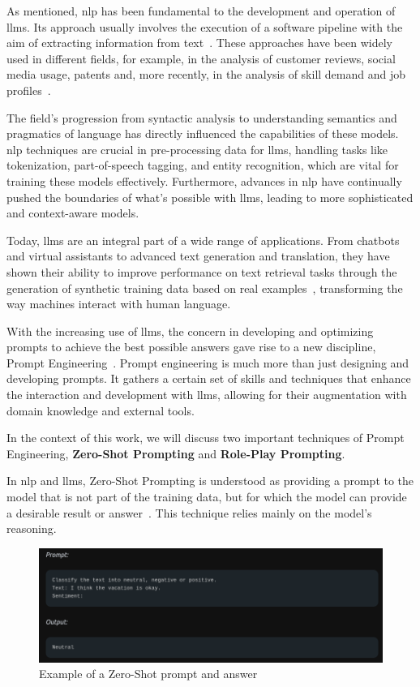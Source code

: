 As mentioned, \ac{nlp} has been fundamental to the development and operation of \ac{llms}. Its approach usually involves the execution of a software pipeline with the aim of extracting information from text~\cite{CHIARELLO2021121177}. These approaches have been widely used in different fields, for example, in the analysis of customer reviews, social media usage, patents and, more recently, in the analysis of skill demand and job profiles~\cite{CHIARELLO2021121177, Fareri_2021}.

The field's progression from syntactic analysis to understanding semantics and pragmatics of language has directly influenced the capabilities of these models. \ac{nlp} techniques are crucial in pre-processing data for \ac{llms}, handling tasks like tokenization, part-of-speech tagging, and entity recognition, which are vital for training these models effectively. Furthermore, advances in \ac{nlp} have continually pushed the boundaries of what's possible with \ac{llms}, leading to more sophisticated and context-aware models.

Today, \ac{llms} are an integral part of a wide range of applications. From chatbots and virtual assistants to advanced text generation and translation, they have shown their ability to improve performance on text retrieval tasks through the generation of synthetic training data based on real examples~\cite{clavié2023large}, transforming the way machines interact with human language. 

With the increasing use of \ac{llms}, the concern in developing and optimizing prompts to achieve the best possible answers gave rise to a new discipline, Prompt Engineering~\cite{prompt_engineering}. Prompt engineering is much more than just designing and developing prompts. It gathers a certain set of skills and techniques that enhance the interaction and development with \ac{llms}, allowing for their augmentation with domain knowledge and external tools.

In the context of this work, we will discuss two important techniques of Prompt Engineering, \textbf{Zero-Shot Prompting} and \textbf{Role-Play Prompting}.

In \ac{nlp} and \ac{llms}, Zero-Shot Prompting is understood as providing a prompt to the model that is not part of the training data, but for which the model can provide a desirable result or answer~\cite{zero_few}. This technique relies mainly on the model’s reasoning.

\begin{figure}[H]
    \centering
    \includegraphics[width=15cm]{figs/zero_shot.png}
    \caption{Example of a Zero-Shot prompt and answer~\cite{zero_shot}}
    \label{fig:zero_shot}
\end{figure}


